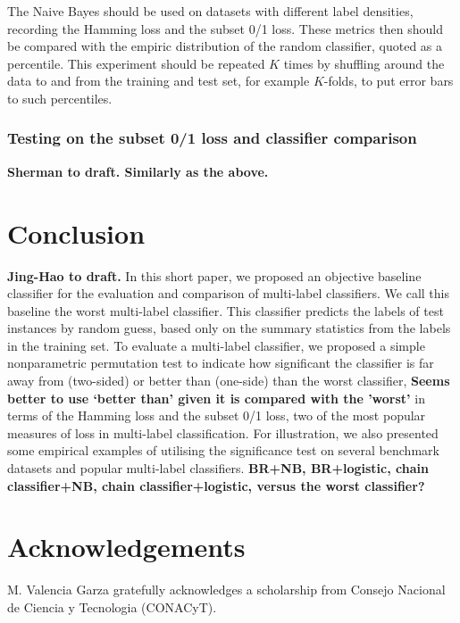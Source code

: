 \documentclass[review]{elsarticle}
\begin{document}
The Naive Bayes should be used on datasets with different label densities, recording the Hamming loss and the subset 0/1 loss. These metrics then should be compared with the empiric distribution of the random classifier, quoted as a percentile. This experiment should be repeated $K$ times by shuffling around the data to and from the training and test set, for example $K$-folds, to put error bars to such percentiles.

\subsubsection{Testing on the subset 0/1 loss  and classifier comparison}\label{sss:01}

{\bf Sherman to draft. Similarly as the above.}




\section{Conclusion}

{\bf Jing-Hao to draft.}  In this short paper, we proposed an objective baseline classifier for the evaluation and comparison of multi-label classifiers.  We call this baseline the worst multi-label classifier.  This classifier predicts the labels of test instances by random guess, based only on the summary statistics from the labels in the training set.  To evaluate a multi-label classifier, we proposed a simple nonparametric permutation test to indicate how significant the classifier is far away from (two-sided) or better than (one-side) than the worst classifier, {\bf Seems better to use `better than' given it is compared with the 'worst'} in terms of the Hamming loss and the subset 0/1 loss, two of the most popular measures of loss in multi-label classification.  For illustration, we also presented some empirical examples of utilising the significance test on several benchmark datasets and popular multi-label classifiers. {\bf BR+NB, BR+logistic, chain classifier+NB, chain classifier+logistic, versus the worst classifier?}


\section*{Acknowledgements}
M. Valencia Garza gratefully acknowledges a scholarship from Consejo Nacional de Ciencia y Tecnologia (CONACyT).



\end{document}
